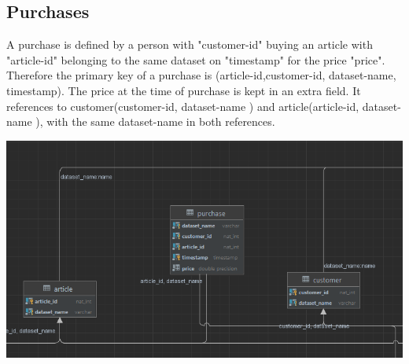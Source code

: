 \documentclass[a4paper,12pt]{article}
\begin{document}
	\subsection{Purchases}
	A purchase is defined by a person with "customer-id" buying an article with "article-id" belonging to the same dataset on "timestamp" for the price "price". Therefore the primary key of a purchase is (article-id,customer-id, dataset-name, timestamp). The price at the time of purchase is kept in an extra field. It references to customer(customer-id, dataset-name ) and article(article-id, dataset-name ), with the same dataset-name in both references.
		\begin{center}
		  		\includegraphics[width=\textwidth]{Purchase.png}
	\end{center}
	\pagebreak	
\end{document}

